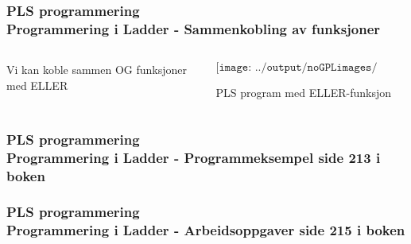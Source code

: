 \documentclass[aspectratio=169,xcolor=dvipsnames]{beamer}
\begin{document}
\begin{frame}
	\frametitle{PLS programmering \\ Programmering i Ladder - Sammenkobling av funksjoner }
	\begin{columns}
		\begin{column}{0.3\textwidth}
	Vi kan koble sammen OG funksjoner med ELLER
			
		\end{column}

		\begin{column}{0.7\textwidth}
	$$\texttt{[image: ../output/noGPLimages/pTIFPLCx08.png]}$$
	\begin{center}
	PLS program med ELLER-funksjon
	\end{center}
		\end{column}
	\end{columns}
\end{frame}
\begin{frame}
	\frametitle{PLS programmering \\ Programmering i Ladder - Programmeksempel side 213 i boken}
\end{frame}
\begin{frame}
	\frametitle{PLS programmering \\ Programmering i Ladder - Arbeidsoppgaver side 215 i boken}
\end{frame}
\end{document}

